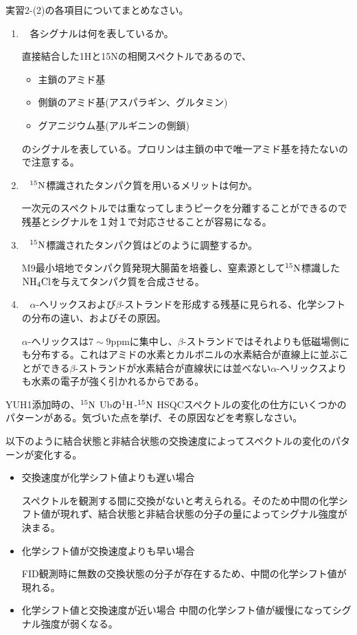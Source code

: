 \documentclass[a4paper,papersize,dvipdfmx]{jsarticle}
\newcommand{\mon}[1]{\item[({#1})] \ }
\begin{document}
\begin{tcolorbox}[colback=white,colbacktitle=black!10!white,coltitle=black,title={1}]
実習2-(2)の各項目についてまとめなさい。
\end{tcolorbox}

\begin{enumerate}
\mon{ア} 各シグナルは何を表しているか。

直接結合した1Hと15Nの相関スペクトルであるので、
\begin{itemize}
\item 主鎖のアミド基
\item 側鎖のアミド基(アスパラギン、グルタミン)
\item グアニジウム基(アルギニンの側鎖)
\end{itemize}
のシグナルを表している。プロリンは主鎖の中で唯一アミド基を持たないので注意する。

\mon{イ} $\rm ^{15}N$標識されたタンパク質を用いるメリットは何か。

一次元のスペクトルでは重なってしまうピークを分離することができるので残基とシグナルを１対１で対応させることが容易になる。

\mon{ウ} $\rm ^{15}N$標識されたタンパク質はどのように調整するか。

M9最小培地でタンパク質発現大腸菌を培養し、窒素源として$\rm ^{15}N$標識した$\rm NH_4Cl$を与えてタンパク質を合成させる。

\mon{エ} $\alpha$-へリックスおよび$\beta$-ストランドを形成する残基に見られる、化学シフトの分布の違い、およびその原因。

$\alpha$-へリックスは$7\sim9$ppmに集中し、$\beta$-ストランドではそれよりも低磁場側にも分布する。これはアミドの水素とカルボニルの水素結合が直線上に並ぶことができる$\beta$-ストランドが水素結合が直線状には並べない$\alpha$-へリックスよりも水素の電子が強く引かれるからである。
\end{enumerate}


\begin{tcolorbox}[colback=white,colbacktitle=black!10!white,coltitle=black,title={2}]
YUH1添加時の、$\rm ^{15}N$ Ubの$\rm ^1H$-$\rm ^{15}N$ HSQCスペクトルの変化の仕方にいくつかのパターンがある。気づいた点を挙げ、その原因などを考察しなさい。
\end{tcolorbox}

以下のように結合状態と非結合状態の交換速度によってスペクトルの変化のパターンが変化する。
\begin{itemize}
\item 交換速度が化学シフト値よりも遅い場合

スペクトルを観測する間に交換がないと考えられる。そのため中間の化学シフト値が現れず、結合状態と非結合状態の分子の量によってシグナル強度が決まる。

\item 化学シフト値が交換速度よりも早い場合

FID観測時に無数の交換状態の分子が存在するため、中間の化学シフト値が現れる。
\item 化学シフト値と交換速度が近い場合
中間の化学シフト値が緩慢になってシグナル強度が弱くなる。
\end{itemize}
\end{document}
